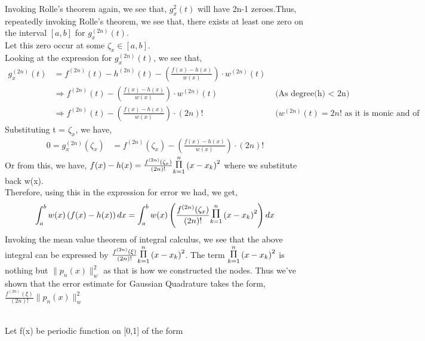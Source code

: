 \documentclass[letterpaper]{exam}
\begin{document}
\begin{questions}
\begin{solution}
Invoking Rolle's theorem again, we see that, $g^{2}_x(t)$ will have 2n-1 zeroes.Thus, repeatedly invoking Rolle's theorem, we see that, there exists at least one zero on the interval $[a,b]$ for $g^{(2n)}_x(t)$.\\
Let this zero occur at some $\zeta_{x} \in [a,b]$.\\
Looking at the expression for $g^{(2n)}_x(t)$, we see that,
\begin{align*}
    g^{(2n)}_x(t) &= f^{(2n)}(t) - h^{(2n)}(t) - \left( \frac{f(x)-h(x)}{w(x)}\right)\cdot w^{(2n)}(t)\\
    &\Rightarrow 
    f^{(2n)}(t) - \left( \frac{f(x)-h(x)}{w(x)}\right)\cdot w^{(2n)}(t) & \mbox{ (As degree(h) $<$ 2n)}\\
    &\Rightarrow 
    f^{(2n)}(t) - \left( \frac{f(x)-h(x)}{w(x)}\right)\cdot (2n)! & \mbox{ ($w^{(2n)}(t) = 2n!$ as it is monic and of degree 2n)}
\end{align*}
Substituting t = $\zeta_{x}$, we have,
\begin{align*}
    0 = g^{(2n)}_x(\zeta_{x}) &= f^{(2n)}(\zeta_{x}) - \left( \frac{f(x)-h(x)}{w(x)}\right)\cdot (2n)!
\end{align*}
Or from this, we have, $f(x) - h(x) = \frac{f^{(2n)}(\zeta_{x})}{(2n)!}\overset{n}{\underset{k = 1}{\mathlarger{\mathlarger{\Pi}}}}\left(x-x_k\right)^2$ where we substitute back w(x).\\
Therefore, using this in the expression for error we had, we get,
\begin{align*}
    \int_{a}^{b} w(x)\left(f(x) - h(x)\right) dx = \int_{a}^{b} w(x)\left(\frac{f^{(2n)}(\zeta_{x})}{(2n)!}\overset{n}{\underset{k = 1}{\mathlarger{\mathlarger{\Pi}}}}\left(x-x_k\right)^2\right) dx
\end{align*}
Invoking the mean value theorem of integral calculus, we see that the above integral can be expressed by 
$\frac{f^{(2n)}(\xi)}{(2n)!}\overset{n}{\underset{k = 1}{\mathlarger{\mathlarger{\Pi}}}}\left(x-x_k\right)^2$. The term  $\overset{n}{\underset{k = 1}{\mathlarger{\mathlarger{\Pi}}}}\left(x-x_k\right)^2$ is nothing but $\|p_n(x)\|_{w}^2$ as that is how we constructed the nodes. Thus we've shown that the error estimate for Gaussian Quadrature takes the form, $\frac{f^{(2n)}(\xi)}{(2n)!} \|p_n(x)\|_{w}^2$
\end{solution}
\\
Let f(x) be periodic function on [0,1] of the form\\
\begin{align*}

\end{align*}
\end{questions}
\end{document}
